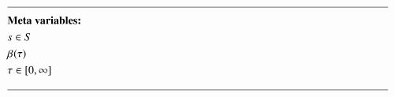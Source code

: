 
\newpage
\begin{alignat}{2}
	& \text{\rule{\linewidth}{0.4pt}} \notag \label{}                                                                                                                                                                                                                                                                                                                                                                     \\ 
	& \textbf{Meta variables:} \notag                                                                                                                                                                                                                                                                                                                                                \\ 
	& \ElementScheduler \in \SetScheduler                                                                                                                                                                                                                                                                                                                                           \label{eqn:meta:scheduler:strategic}  \\ 
	& \VarTacticalWork{}{}                                                                                                                                                                                                                                                                                                                                                          \label{eqn:meta:tactical:strategic}      \\ 
	& \tau \in [0, \infty]                                                                                                                                                                                                                                                                                                                                                          \label{eqn:meta:time:strategic}                                     \\ 
	& \text{\rule{\linewidth}{0.4pt}} \notag                                                                                                                                                                                                                                                                                                                                              \\

\end{alignat}
